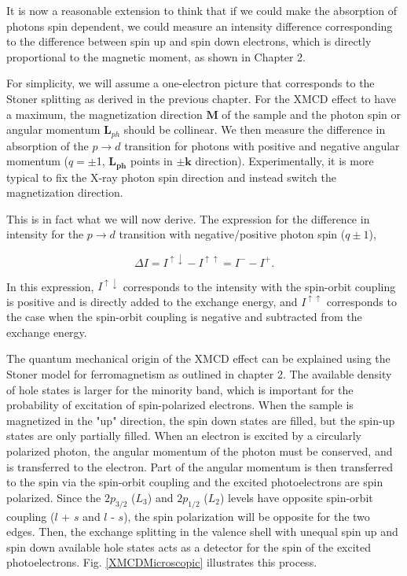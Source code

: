 It is now a reasonable extension to think that if we could make the absorption of photons spin dependent, we could measure an intensity difference corresponding to the difference between spin up and spin down electrons, which is directly proportional to the magnetic moment, as shown in Chapter 2.

For simplicity, we will assume a one-electron picture that corresponds to the Stoner splitting as derived in the previous chapter. For the XMCD effect to have a maximum, the magnetization direction $\pmb{M}$ of the sample and the photon spin or angular momentum $\pmb{L}_{ph}$ should be collinear. We then measure the difference in absorption of the $p \rightarrow d$ transition for photons with positive and negative angular momentum ($q = \pm$1, $\pmb{L_{ph}}$ points in $\pm\pmb{k}$ direction). Experimentally, it is more typical to fix the X-ray photon spin direction and instead switch the magnetization direction.

This is in fact what we will now derive. The expression for the difference in intensity for the $p\rightarrow d$ transition with negative/positive photon spin ($q\pm 1$),

\begin{equation}
\Delta I = I^{\uparrow \downarrow} - I^{\uparrow \uparrow} = I^- - I^+.
\end{equation}

In this expression, $I^{\uparrow \downarrow}$ corresponds to the intensity with the spin-orbit coupling is positive and is directly added to the exchange energy, and $I^{\uparrow \uparrow}$ corresponds to the case when the spin-orbit coupling is negative and subtracted from the exchange energy.

The quantum mechanical origin of the XMCD effect can be explained using the Stoner model for ferromagnetism as outlined in chapter 2. The available density of hole states is larger for the minority band, which is important for the probability of excitation of spin-polarized electrons. When the sample is magnetized in the "up" direction, the spin down states are filled, but the spin-up states are only partially filled. When an electron is excited by a circularly polarized photon, the angular momentum of the photon must be conserved, and is transferred to the electron. Part of the angular momentum is then transferred to the spin via the spin-orbit coupling and the excited photoelectrons are spin polarized. Since the $2p_{3/2}$ ($L_3$) and $2p_{1/2}$ ($L_2$) levels have opposite spin-orbit coupling ($l$ + $s$ and $l$ - $s$), the spin polarization will be opposite for the two edges. Then, the exchange splitting in the valence shell with unequal spin up and spin down available hole states acts as a detector for the spin of the excited photoelectrons. Fig. \ref{XMCDMicroscopic} illustrates this process.

